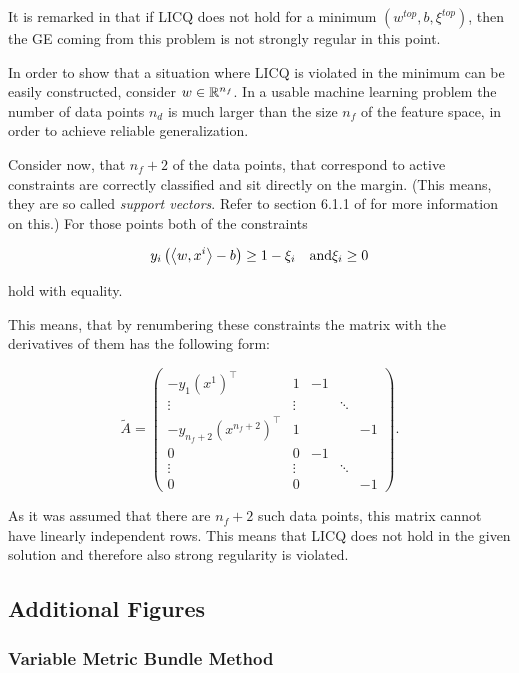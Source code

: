 It is remarked in \cite[p. 96]{Outrata1998} that if LICQ does not hold for a minimum \((w^{top},b,\xi^{top})\), then the GE coming from this problem is not strongly regular in this point.

In order to show that a situation where LICQ is violated in the minimum can be easily constructed, consider \(w \in \mathbb{R}^{n_f}\). In a usable machine learning problem the number of data points \(n_d\) is much larger than the size \(n_f\) of the feature space, in order to achieve reliable generalization.

Consider now, that \(n_f+2\) of the data points, that correspond to active constraints are correctly classified and sit directly on the margin. (This means, they are so called \emph{support vectors}. Refer to section 6.1.1 of \cite{Cristianini2000} for more information on this.)
For those points both of the constraints 

\[ y_i\left(\left\langle w,x^i\right\rangle-b\right) \geq 1-\xi_i \quad \text{and} \xi_i \geq 0 \]

hold with equality.

This means, that by renumbering these constraints the matrix with the derivatives of them has the following form:

\[  \tilde{A} = \begin{pmatrix} -y_1(x^1)^{\top} & 1 & -1 \\
                     \vdots & \vdots & & \ddots \\
										-y_{n_f+2}(x^{n_f+2})^{\top} & 1 & & & -1\\										0 & 0 & -1 \\
										\vdots & \vdots & & \ddots \\
										0 & 0 & & & -1\end{pmatrix}.\]
										
As it was assumed that there are \(n_f+2\) such data points, this matrix cannot have linearly independent rows. This means that LICQ does not hold in the given solution and therefore also strong regularity is violated.

\subsection{Additional Figures}

\subsubsection{Variable Metric Bundle Method}

